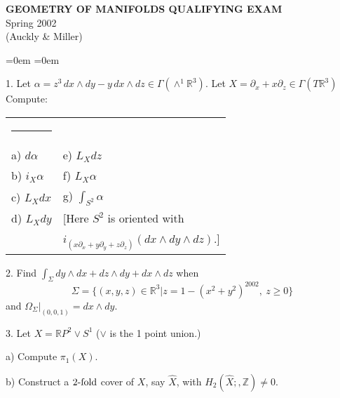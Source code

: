 \documentclass[12pt]{article}
\def\ds{\displaystyle}
\def\R{{\mathbb R}}
\def\Z{{\mathbb Z}}
\begin{document}
\def\R{{\mathbb R}}

\begin{large}
\begin{center}
{\bf
  GEOMETRY OF MANIFOLDS QUALIFYING EXAM}\\
  Spring 2002\\
  (Auckly \& Miller)
\end{center}

\vspace{-.5in}

{
\begin{list}{}
{\itemsep=0em \parsep=0em }\item[]
\end{list}
}

\begin{description}

\item 1.
Let $\alpha=z^3\,dx\wedge dy- y\,dx\wedge dz\in \Gamma(\wedge^1 \R^3)$.
Let $X=\partial_x+x\partial_z \in \Gamma(T\R^3)$\\
Compute:

\vspace{-.2in}
\begin{tabular}{ll}
\rule{3in}{0in} & \\
a) $d\alpha$        & e) $L_X dz$\\
b) $i_X\alpha$ & f) $L_X\alpha$\\
c) $L_Xdx$     & g) $\ds\int_{S^2}\alpha$ \\
d) $L_X dy$    & [Here $S^2$ is oriented with \\
               &
                  $i_{(x\partial_x+y\partial_y
                   +z\partial_z)}(dx\wedge dy\wedge dz)$.]
\end{tabular}

\item 2.
Find $\int_\Sigma dy\wedge dx + dz\wedge dy + dx\wedge dz$
when
$$\Sigma=\{(x,y,z)\in\R^3 | z=1-(x^2+y^2)^{2002}, \ z\geq 0\}$$
and $\Omega_\Sigma |_{(0,0,1)} = dx\wedge dy$.

\item 3.
Let $X=\R P^2 \vee S^1$ \quad ($\vee$ is the 1 point union.)

\item\quad a)
Compute $\pi_1(X)$.

\item\quad b)
Construct a $2\hbox{-fold}$ cover of $X$, say $\widehat X$,
with $H_2(\widehat X;,\Z)\not= 0$.


\end{description}
\end{large}
\end{document}
